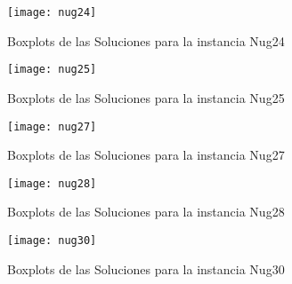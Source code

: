 \documentclass{ci5652}
\begin{document}
\begin{figure}[ht]
	\caption{Boxplots de las Soluciones para la instancia Nug24}
	\texttt{[image: nug24]}
    \centering
    \label{fig:boxplot_nug24}
\end{figure}

\begin{figure}[ht]
	\caption{Boxplots de las Soluciones para la instancia Nug25}
	\texttt{[image: nug25]}
    \centering
    \label{fig:boxplot_nug25}
\end{figure}

\begin{figure}[ht]
	\caption{Boxplots de las Soluciones para la instancia Nug27}
	\texttt{[image: nug27]}
    \centering
    \label{fig:boxplot_nug27}
\end{figure}

\begin{figure}[ht]
	\caption{Boxplots de las Soluciones para la instancia Nug28}
	\texttt{[image: nug28]}
    \centering
    \label{fig:boxplot_nug28}
\end{figure}

\begin{figure}[ht]
	\caption{Boxplots de las Soluciones para la instancia Nug30}
	\texttt{[image: nug30]}
    \centering
    \label{fig:boxplot_nug30}
\end{figure}
\end{document}
